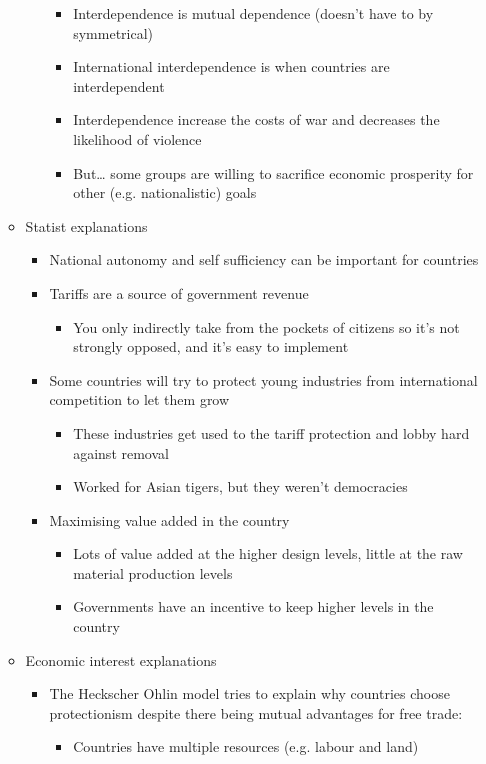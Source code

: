 \documentclass[11pt]{article}
\begin{document}
\begin{itemize}
\begin{itemize}
\begin{itemize}
\begin{itemize}
\item Interdependence is mutual dependence (doesn't have to by symmetrical)
\item International interdependence is when countries are interdependent
\item Interdependence increase the costs of war and decreases the likelihood
of violence
\item But\ldots{} some groups are willing to sacrifice economic prosperity for
other (e.g. nationalistic) goals
\end{itemize}
\end{itemize}
\item Statist explanations
\begin{itemize}
\item National autonomy and self sufficiency can be important for countries
\item Tariffs are a source of government revenue
\begin{itemize}
\item You only indirectly take from the pockets of citizens so it's not
strongly opposed, and it's easy to implement
\end{itemize}
\item Some countries will try to protect young industries from international
competition to let them grow
\begin{itemize}
\item These industries get used to the tariff protection and lobby hard
against removal
\item Worked for Asian tigers, but they weren't democracies
\end{itemize}
\item Maximising value added in the country
\begin{itemize}
\item Lots of value added at the higher design levels, little at the raw
material production levels
\item Governments have an incentive to keep higher levels in the country
\end{itemize}
\end{itemize}
\item Economic interest explanations
\begin{itemize}
\item The Heckscher Ohlin model tries to explain why countries choose
protectionism despite there being mutual advantages for free trade:
\begin{itemize}
\item Countries have multiple resources (e.g. labour and land)

\end{itemize}
\end{itemize}
\end{itemize}
\end{itemize}
\end{document}
